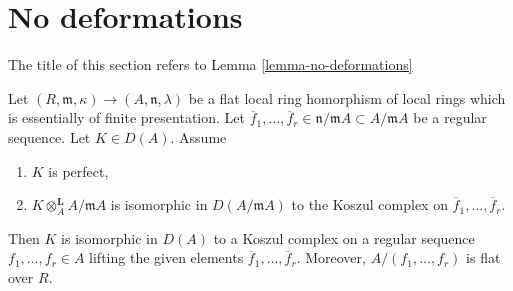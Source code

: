 \section{No deformations}
\label{section-no-deformations}

\noindent
The title of this section refers to Lemma \ref{lemma-no-deformations}

\begin{lemma}
\label{lemma-deform-koszul}
Let $(R, \mathfrak m, \kappa) \to (A, \mathfrak n, \lambda)$
be a flat local ring homorphism of local rings
which is essentially of finite presentation.
Let $\overline{f}_1, \ldots, \overline{f}_r \in \mathfrak n/\mathfrak m A
\subset A/\mathfrak m A$ be a regular sequence. Let $K \in D(A)$. Assume
\begin{enumerate}
\item $K$ is perfect,
\item $K \otimes_A^\mathbf{L} A/\mathfrak m A$ is isomorphic in
$D(A/\mathfrak m A)$ to the
Koszul complex on $\overline{f}_1, \ldots, \overline{f}_r$.
\end{enumerate}
Then $K$ is isomorphic in $D(A)$ to a Koszul complex on a regular sequence
$f_1, \ldots, f_r \in A$ lifting the given elements
$\overline{f}_1, \ldots, \overline{f}_r$. Moreover, $A/(f_1, \ldots, f_r)$
is flat over $R$.
\end{lemma}

